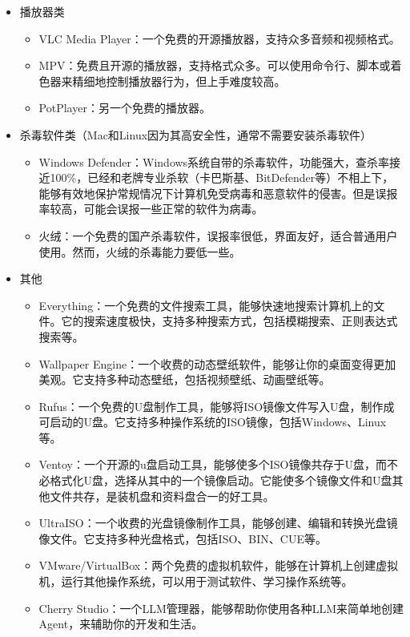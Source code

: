 \begin{itemize}
\begin{itemize}
    \end{itemize}
  \item 播放器类
    \begin{itemize}
      \item VLC Media Player：一个免费的开源播放器，支持众多音频和视频格式。
      \item MPV：免费且开源的播放器，支持格式众多。可以使用命令行、脚本或着色器来精细地控制播放器行为，但上手难度较高。
      \item PotPlayer：另一个免费的播放器。
    \end{itemize}
  \item 杀毒软件类（Mac和Linux因为其高安全性，通常不需要安装杀毒软件）
    \begin{itemize}
      \item Windows Defender：Windows系统自带的杀毒软件，功能强大，查杀率接近100\%，已经和老牌专业杀软（卡巴斯基、BitDefender等）不相上下，能够有效地保护常规情况下计算机免受病毒和恶意软件的侵害。但是误报率较高，可能会误报一些正常的软件为病毒。
      \item 火绒：一个免费的国产杀毒软件，误报率很低，界面友好，适合普通用户使用。然而，火绒的杀毒能力要低一些。
    \end{itemize}
  \item 其他
    \begin{itemize}
      \item Everything：一个免费的文件搜索工具，能够快速地搜索计算机上的文件。它的搜索速度极快，支持多种搜索方式，包括模糊搜索、正则表达式搜索等。
      \item Wallpaper Engine：一个收费的动态壁纸软件，能够让你的桌面变得更加美观。它支持多种动态壁纸，包括视频壁纸、动画壁纸等。
      \item Rufus：一个免费的U盘制作工具，能够将ISO镜像文件写入U盘，制作成可启动的U盘。它支持多种操作系统的ISO镜像，包括Windows、Linux等。
      \item Ventoy：一个开源的u盘启动工具，能够使多个ISO镜像共存于U盘，而不必格式化U盘，选择从其中的一个镜像启动。它能使多个镜像文件和U盘其他文件共存，是装机盘和资料盘合一的好工具。
      \item UltraISO：一个收费的光盘镜像制作工具，能够创建、编辑和转换光盘镜像文件。它支持多种光盘格式，包括ISO、BIN、CUE等。
      \item VMware/VirtualBox：两个免费的虚拟机软件，能够在计算机上创建虚拟机，运行其他操作系统，可以用于测试软件、学习操作系统等。
      \item Cherry Studio：一个LLM管理器，能够帮助你使用各种LLM来简单地创建Agent，来辅助你的开发和生活。
    \end{itemize}
\end{itemize}

